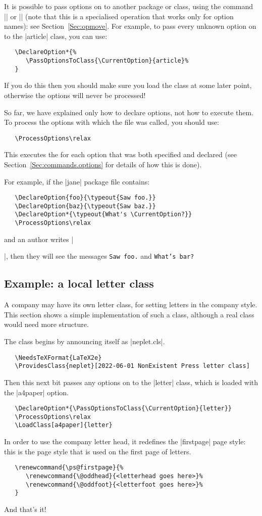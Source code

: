 \documentclass{ltxguide}
\begin{document}
It is possible to pass options on to another package or class, using the
command |\PassOptionsToPackage| or |\PassOptionsToClass| (note that this is a
specialised operation that works only for option names): see
Section~\ref{Sec:opmove}. For example, to pass every unknown option on to the
|article| class, you can use:
\begin{verbatim}
   \DeclareOption*{%
      \PassOptionsToClass{\CurrentOption}{article}%
   }
\end{verbatim}
If you do this then you should make sure you load the class at some later
point, otherwise the options will never be processed!

So far, we have explained only how to declare options, not how to execute them.
To process the options with which the file was called, you should use:
\begin{verbatim}
   \ProcessOptions\relax
\end{verbatim}
This executes the  for each option that was both specified and declared
(see Section~\ref{Sec:commands.options} for details of how this is done).

For example, if the |jane| package file contains:
\begin{verbatim}
   \DeclareOption{foo}{\typeout{Saw foo.}}
   \DeclareOption{baz}{\typeout{Saw baz.}}
   \DeclareOption*{\typeout{What's \CurrentOption?}}
   \ProcessOptions\relax
\end{verbatim}
and an author writes |\usepackage[foo,bar]{jane}|, then they will see the
messages \texttt{Saw foo.} and \texttt{What's bar?}

\subsection{Example: a local letter class}

A company may have its own letter class, for setting letters in the
company style.  This section shows a simple implementation of such a
class, although a real class would need more structure.

The class begins by announcing itself as |neplet.cls|.
\begin{verbatim}
   \NeedsTeXFormat{LaTeX2e}
   \ProvidesClass{neplet}[2022-06-01 NonExistent Press letter class]
\end{verbatim}
Then this next bit passes any options on to the |letter| class, which is loaded
with the |a4paper| option.
\begin{verbatim}
   \DeclareOption*{\PassOptionsToClass{\CurrentOption}{letter}}
   \ProcessOptions\relax
   \LoadClass[a4paper]{letter}
\end{verbatim}
In order to use the company letter head, it redefines the |firstpage| page
style: this is the page style that is used on the first page of letters.
\begin{verbatim}
   \renewcommand{\ps@firstpage}{%
      \renewcommand{\@oddhead}{<letterhead goes here>}%
      \renewcommand{\@oddfoot}{<letterfoot goes here>}%
   }
\end{verbatim}
And that's it!
\end{document}
